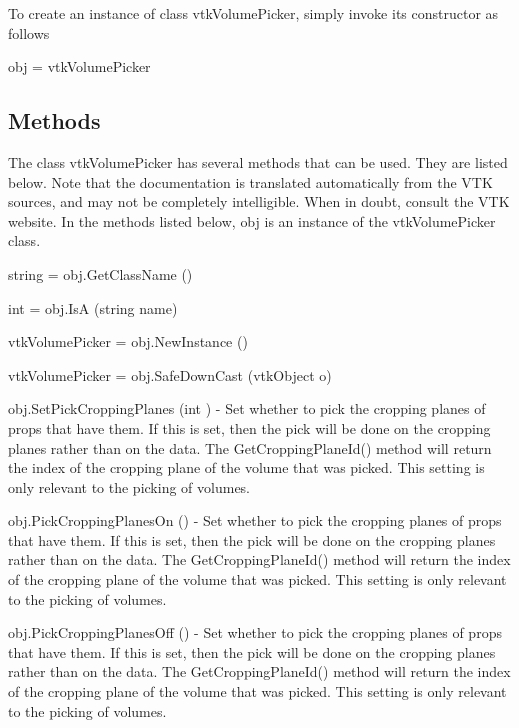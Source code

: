 To create an instance of class vtk\-Volume\-Picker, simply invoke its constructor as follows \begin{DoxyVerb}  obj = vtkVolumePicker
\end{DoxyVerb}
 \hypertarget{vtkwidgets_vtkxyplotwidget_Methods}{}\subsection{Methods}\label{vtkwidgets_vtkxyplotwidget_Methods}
The class vtk\-Volume\-Picker has several methods that can be used. They are listed below. Note that the documentation is translated automatically from the V\-T\-K sources, and may not be completely intelligible. When in doubt, consult the V\-T\-K website. In the methods listed below, {\ttfamily obj} is an instance of the vtk\-Volume\-Picker class. 
\begin{DoxyItemize}
\item {\ttfamily string = obj.\-Get\-Class\-Name ()}  
\item {\ttfamily int = obj.\-Is\-A (string name)}  
\item {\ttfamily vtk\-Volume\-Picker = obj.\-New\-Instance ()}  
\item {\ttfamily vtk\-Volume\-Picker = obj.\-Safe\-Down\-Cast (vtk\-Object o)}  
\item {\ttfamily obj.\-Set\-Pick\-Cropping\-Planes (int )} -\/ Set whether to pick the cropping planes of props that have them. If this is set, then the pick will be done on the cropping planes rather than on the data. The Get\-Cropping\-Plane\-Id() method will return the index of the cropping plane of the volume that was picked. This setting is only relevant to the picking of volumes.  
\item {\ttfamily obj.\-Pick\-Cropping\-Planes\-On ()} -\/ Set whether to pick the cropping planes of props that have them. If this is set, then the pick will be done on the cropping planes rather than on the data. The Get\-Cropping\-Plane\-Id() method will return the index of the cropping plane of the volume that was picked. This setting is only relevant to the picking of volumes.  
\item {\ttfamily obj.\-Pick\-Cropping\-Planes\-Off ()} -\/ Set whether to pick the cropping planes of props that have them. If this is set, then the pick will be done on the cropping planes rather than on the data. The Get\-Cropping\-Plane\-Id() method will return the index of the cropping plane of the volume that was picked. This setting is only relevant to the picking of volumes.  

\end{DoxyItemize}
